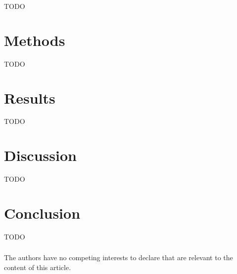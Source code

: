 \documentclass[runningheads]{llncs}
\begin{document}
TODO

\section{Methods}
\label{sec:methods}

%

TODO

\section{Results}
\label{sec:results}


TODO

\section{Discussion}
\label{sec:discussion}

TODO

\section{Conclusion}
\label{sec:conclusion}

TODO

\begin{credits}

\subsubsection{\discintname}
The authors have no competing interests to declare that are relevant to the
content of this article.
\end{credits}



\end{document}
